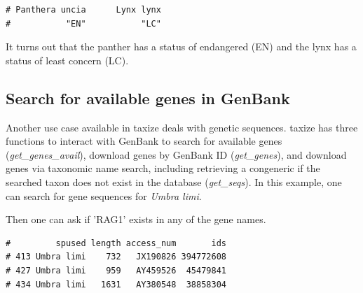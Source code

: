 \begin{sloppypar}
\begin{knitrout}\small

\color{fgcolor}
\begin{kframe}
\begin{alltt}
 \hlkwb{<-} \hlstd{(}\hlstd{(}\hlstd{,} \hlstd{))}
\end{alltt}
\begin{verbatim}
# Panthera uncia      Lynx lynx 
#           "EN"           "LC"
\end{verbatim}
\end{kframe}
\end{knitrout}

It turns out that the panther has a status of endangered (EN) and the lynx has a status of least concern (LC).


\subsection{Search for available genes in GenBank}
Another use case available in taxize deals with genetic sequences. 
taxize has three functions to interact with GenBank to search for available genes \\ (\emph{get\_genes\_avail}), download genes by GenBank ID (\emph{get\_genes}), and download genes via taxonomic name search, including retrieving a congeneric if the searched taxon does not exist in the database (\emph{get\_seqs}). 
In this example, one can search for gene sequences for \emph{Umbra limi}.

\begin{knitrout}\small

\color{fgcolor}\begin{kframe}
\begin{alltt}
 \hlkwb{<-} \hlstd{(} \hlstd{=} \hlstd{,}
                        \hlstd{=} \hlstd{,}
                        \hlstd{=} \hlstd{)}
\end{alltt}
\end{kframe}
\end{knitrout}


Then one can ask if 'RAG1' exists in any of the gene names.

\begin{knitrout}\small
\color{fgcolor}\begin{kframe}
\begin{alltt}
\hlstd{R> out[}\hlstd{(}\hlopt{$}  \hlstd{=} \hlstd{),} \hlopt{-}\hlstd{]}
\end{alltt}
\begin{verbatim}
#         spused length access_num       ids
# 413 Umbra limi    732   JX190826 394772608
# 427 Umbra limi    959   AY459526  45479841
# 434 Umbra limi   1631   AY380548  38858304
\end{verbatim}
\end{kframe}
\end{knitrout}



\end{sloppypar}
